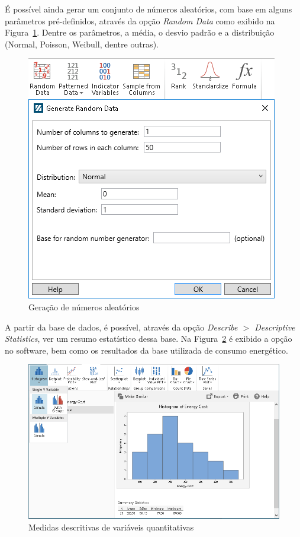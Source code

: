 \documentclass{article}
\begin{document}
É possível ainda gerar um conjunto de números aleatórios, com base em alguns parâmetros pré-definidos, através da opção \textit{Random Data} como exibido na Figura~\ref{fig:aleatorios}. Dentre os parâmetros, a média, o desvio padrão e a distribuição (Normal, Poisson, Weibull, dentre outras).

\begin{figure}[!h]
    \centering
    \includegraphics[scale=0.75]{aleatorios.png}
    \caption{Geração de números aleatórios}
    \label{fig:aleatorios}
\end{figure}

\newpage 

A partir da base de dados, é possível, através da opção \textit{Describe $>$ Descriptive Statistics}, ver um resumo estatístico dessa base. Na Figura~\ref{fig:descritiva} é exibido a opção no software, bem como os resultados da base utilizada de consumo energético.

\begin{figure}[!h]
    \centering
    \includegraphics[scale=0.75]{descritiva.png}
    \caption{Medidas descritivas de variáveis quantitativas}
    \label{fig:descritiva}
\end{figure}
\end{document}
